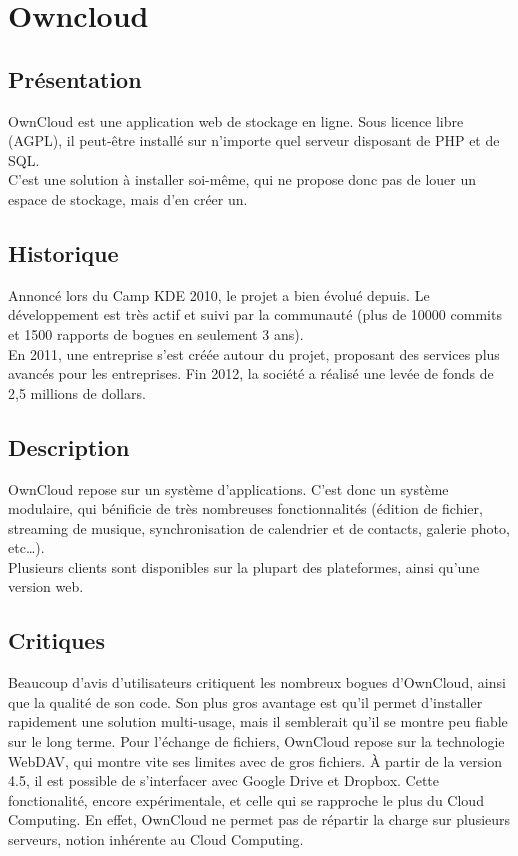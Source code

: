 \chapter{Owncloud}
\thispagestyle{EIP} %
\section{Présentation}
OwnCloud est une application web de stockage en ligne. Sous licence libre (AGPL), il peut-être installé sur n'importe quel serveur disposant de PHP et de SQL.\\
C'est une solution à installer soi-même, qui ne propose donc pas de louer un espace de stockage, mais d'en créer un.\\

\section{Historique}
Annoncé lors du Camp KDE 2010, le projet a bien évolué depuis. Le développement est très actif et suivi par la communauté (plus de 10000 commits et 1500 rapports de bogues en seulement 3 ans).\\

En 2011, une entreprise s'est créée autour du projet, proposant des services plus avancés pour les entreprises. Fin 2012, la société a réalisé une levée de fonds de 2,5 millions de dollars.

\section{Description}
OwnCloud repose sur un système d'applications. C'est donc un système modulaire, qui bénificie de très nombreuses fonctionnalités (édition de fichier, streaming de musique, synchronisation de calendrier et de contacts, galerie photo, etc…).\\
Plusieurs clients sont disponibles sur la plupart des plateformes, ainsi qu'une version web.\\

\section{Critiques}
Beaucoup d'avis d'utilisateurs critiquent les nombreux bogues d'OwnCloud, ainsi que la qualité de son code. Son plus gros avantage est qu'il permet d'installer rapidement une solution multi-usage, mais il semblerait qu'il se montre peu fiable sur le long terme.
Pour l'échange de fichiers, OwnCloud repose sur la technologie WebDAV, qui montre vite ses limites avec de gros fichiers.
À partir de la version 4.5, il est possible de s'interfacer avec Google Drive et Dropbox. Cette fonctionalité, encore expérimentale, et celle qui se rapproche le plus du Cloud Computing. En effet, OwnCloud ne permet pas de répartir la charge sur plusieurs serveurs, notion inhérente au Cloud Computing.

